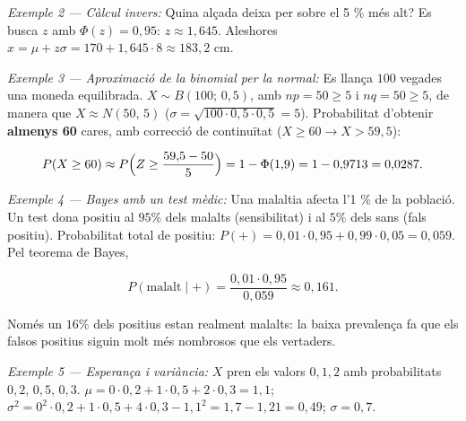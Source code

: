 \emph{Exemple 2 --- Càlcul invers:} Quina alçada deixa per sobre el 5 \% més alt? Es busca $z$ amb $\Phi(z)=0{,}95$: $z\approx1{,}645$. Aleshores $x=\mu+z\sigma=170+1{,}645\cdot8\approx183{,}2$ cm.

\emph{Exemple 3 --- Aproximació de la binomial per la normal:} Es llança $100$ vegades una moneda equilibrada. $X\sim B(100;\,0{,}5)$, amb $np=50\ge5$ i $nq=50\ge5$, de manera que $X\approx N(50,\,5)$ ($\sigma=\sqrt{100\cdot0{,}5\cdot0{,}5}=5$). Probabilitat d'obtenir \textbf{almenys 60} cares, amb correcció de continuïtat ($X\ge60\to X>59{,}5$):

\begin{equation*}
P(X\ge60)\approx P\Bigl(Z\ge\frac{59{,}5-50}{5}\Bigr)=1-\Phi(1{,}9)=1-0{,}9713=0{,}0287.
\end{equation*}

\emph{Exemple 4 --- Bayes amb un test mèdic:} Una malaltia afecta l'1 \% de la població. Un test dona positiu al $95\%$ dels malalts (sensibilitat) i al $5\%$ dels sans (fals positiu). Probabilitat total de positiu: $P(+)=0{,}01\cdot0{,}95+0{,}99\cdot0{,}05=0{,}059$. Pel teorema de Bayes,

\begin{equation*}
P(\text{malalt}\mid+)=\frac{0{,}01\cdot0{,}95}{0{,}059}\approx0{,}161.
\end{equation*}

Només un $16\%$ dels positius estan realment malalts: la baixa prevalença fa que els falsos positius siguin molt més nombrosos que els vertaders.

\emph{Exemple 5 --- Esperança i variància:} $X$ pren els valors $0,1,2$ amb probabilitats $0{,}2,\,0{,}5,\,0{,}3$. $\mu=0\cdot0{,}2+1\cdot0{,}5+2\cdot0{,}3=1{,}1$; $\sigma^{2}=0^2\cdot0{,}2+1\cdot0{,}5+4\cdot0{,}3-1{,}1^{2}=1{,}7-1{,}21=0{,}49$; $\sigma=0{,}7$.
